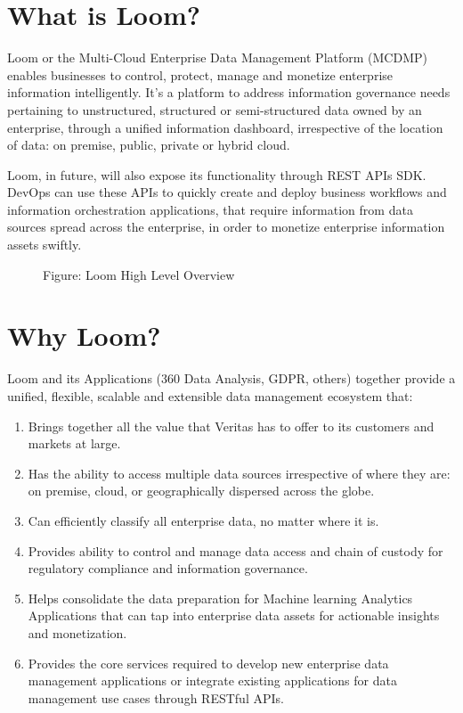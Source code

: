 \documentclass[letterpaper,10pt,english]{sphinxmanual}
\begin{document}
\section{What is Loom?}
\label{\detokenize{loom_getting_started_guide:what-is-loom}}
Loom or the Multi-Cloud Enterprise Data Management Platform (MCDMP) enables businesses to control, protect, manage and monetize enterprise information intelligently. It’s a platform to address information governance needs pertaining to unstructured, structured or semi-structured data owned by an enterprise, through a unified information dashboard, irrespective of the location of data: on premise, public, private or hybrid cloud.

Loom, in future, will also expose its functionality through REST APIs SDK.  DevOps can use these APIs to quickly create and deploy business workflows and information orchestration applications, that require information from data sources spread across the enterprise, in order to monetize enterprise information assets swiftly.

\begin{figure}[htbp]
\centering
\capstart

\noindent{}
\caption{Figure: Loom High Level Overview}\label{\detokenize{loom_getting_started_guide:id9}}\end{figure}


\section{Why Loom?}
\label{\detokenize{loom_getting_started_guide:why-loom}}
Loom and its Applications (360 Data Analysis, GDPR, others) together provide a unified, flexible, scalable and extensible data management ecosystem that:
\begin{enumerate}
\item {} 
Brings together all the value that Veritas has to offer to its customers and markets at large.

\item {} 
Has the ability to access multiple data sources irrespective of where they are: on premise, cloud, or geographically dispersed across the globe.

\item {} 
Can efficiently classify all enterprise data, no matter where it is.

\item {} 
Provides ability to control and manage data access and chain of custody for regulatory compliance and information governance.

\item {} 
Helps consolidate the data preparation for Machine learning Analytics Applications that can tap into enterprise data assets for actionable insights and monetization.

\item {} 
Provides the core services required to develop new enterprise data management applications or integrate existing applications for data management use cases through RESTful APIs.

\end{enumerate}
\end{document}
